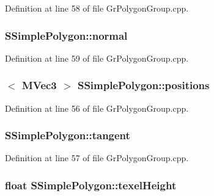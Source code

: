Definition at line 58 of file GrPolygonGroup.cpp.\hypertarget{struct_s_simple_polygon_0b9b7c7c6003096ce4362f81486b2c82}{
\subsubsection[{normal}]{ {\bf SSimplePolygon::normal}}}
\label{struct_s_simple_polygon_0b9b7c7c6003096ce4362f81486b2c82}




Definition at line 59 of file GrPolygonGroup.cpp.\hypertarget{struct_s_simple_polygon_474a336bea3a1e9e988b9d1211772e85}{
\subsubsection[{positions}]{$<$ {\bf MVec3} $>$ {\bf SSimplePolygon::positions}}}
\label{struct_s_simple_polygon_474a336bea3a1e9e988b9d1211772e85}




Definition at line 56 of file GrPolygonGroup.cpp.\hypertarget{struct_s_simple_polygon_c22461865e7eff26f0fed34c6eab08c6}{
\subsubsection[{tangent}]{ {\bf SSimplePolygon::tangent}}}
\label{struct_s_simple_polygon_c22461865e7eff26f0fed34c6eab08c6}




Definition at line 57 of file GrPolygonGroup.cpp.\hypertarget{struct_s_simple_polygon_615cc6a328ae01bf15c78afa713c3e10}{
\subsubsection[{texelHeight}]{\setlength{\rightskip}{0pt plus 5cm}float {\bf SSimplePolygon::texelHeight}}}
\label{struct_s_simple_polygon_615cc6a328ae01bf15c78afa713c3e10}




